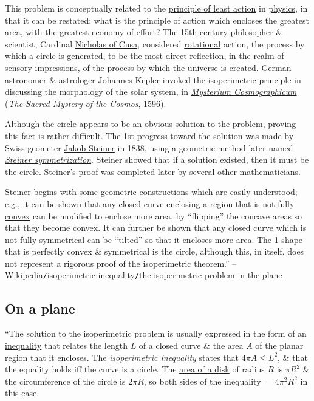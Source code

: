 \documentclass[oneside]{book}
\numberwithin{equation}{section}
\begin{document}
This problem is conceptually related to the \href{https://en.wikipedia.org/wiki/Principle_of_least_action}{principle of least action} in \href{https://en.wikipedia.org/wiki/Physics}{physics}, in that it can be restated: what is the principle of action which encloses the greatest area, with the greatest economy of effort? The 15th-century philosopher \& scientist, Cardinal \href{https://en.wikipedia.org/wiki/Nicholas_of_Cusa}{Nicholas of Cusa}, considered \href{https://en.wikipedia.org/wiki/Rotation}{rotational} action, the process by which a \href{https://en.wikipedia.org/wiki/Circle}{circle} is generated, to be the most direct reflection, in the realm of sensory impressions, of the process by which the universe is created. German astronomer \& astrologer \href{https://en.wikipedia.org/wiki/Johannes_Kepler}{Johannes Kepler} invoked the isoperimetric principle in discussing the morphology of the solar system, in \href{https://en.wikipedia.org/wiki/Mysterium_Cosmographicum}{\textit{Mysterium Cosmographicum}} (\textit{The Sacred Mystery of the Cosmos}, 1596).

Although the circle appears to be an obvious solution to the problem, proving this fact is rather difficult. The 1st progress toward the solution was made by Swiss geometer \href{https://en.wikipedia.org/wiki/Jakob_Steiner}{Jakob Steiner} in 1838, using a geometric method later named \href{https://en.wikipedia.org/wiki/Symmetrization_methods#Steiner_Symmetrization}{\textit{Steiner symmetrization}}. Steiner showed that if a solution existed, then it must be the circle. Steiner's proof was completed later by several other mathematicians.

Steiner begins with some geometric constructions which are easily understood; e.g., it can be shown that any closed curve enclosing a region that is not fully \href{https://en.wikipedia.org/wiki/Convex_set}{convex} can be modified to enclose more area, by ``flipping'' the concave areas so that they become convex. It can further be shown that any closed curve which is not fully symmetrical can be ``tilted'' so that it encloses more area. The 1 shape that is perfectly convex \& symmetrical is the circle, although this, in itself, does not represent a rigorous proof of the isoperimetric theorem.'' -- \href{https://en.wikipedia.org/wiki/Isoperimetric_inequality#The_isoperimetric_problem_in_the_plane}{Wikipedia\texttt{/}isoperimetric inequality\texttt{/}the isoperimetric problem in the plane}

\subsection{On a plane}
``The solution to the isoperimetric problem is usually expressed in the form of an \href{https://en.wikipedia.org/wiki/Inequality_(mathematics)}{inequality} that relates the length $L$ of a closed curve \& the area $A$ of the planar region that it encloses. The \textit{isoperimetric inequality} states that $4\pi A\le L^2$, \& that the equality holds iff the curve is a circle. The \href{https://en.wikipedia.org/wiki/Area_of_a_disk}{area of a disk} of radius $R$ is $\pi R^2$ \& the circumference of the circle is $2\pi R$, so both sides of the inequality $= 4\pi^2R^2$ in this case.
\end{document}
